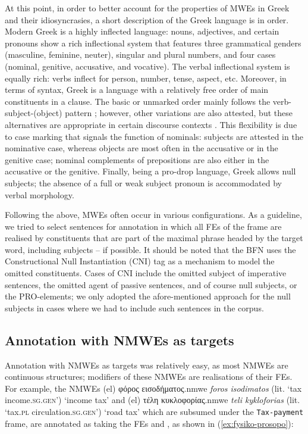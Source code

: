 \documentclass[output=paper,colorlinks,citecolor=brown]{langscibook}
\begin{document}
At this point, in order to better account for the properties of MWEs in Greek and their idiosyncrasies, a short description of the Greek language is in order. Modern Greek is a highly inflected language: nouns, adjectives, and certain pronouns show a rich inflectional system that features three grammatical genders (masculine, feminine, neuter), singular and plural numbers, and four cases (nominal, genitive, accusative, and vocative). The verbal inflectional system is equally rich: verbs inflect for person, number, tense, aspect, etc. Moreover, in terms of syntax, Greek is a language with a relatively free order of main constituents in a clause. The basic or unmarked order mainly follows the verb-subject-(object) pattern \citep[426]{holton_etal_1997}; however, other variations are also attested, but these alternatives are appropriate in certain discourse contexts \citep{holton_etal_1997}. This flexibility is due to case marking that signals the function of nominals: subjects are attested in the nominative case, whereas objects are most often in the accusative or in the genitive case; nominal complements of prepositions are also either in the accusative or the genitive. Finally, being a pro-drop language, Greek allows null subjects; the absence of a full or weak subject pronoun is accommodated by verbal morphology. 

Following the above, MWEs often occur in various configurations. As a guideline, we tried to select sentences for annotation in which all FEs of the frame are realised by constituents that are part of the maximal phrase headed by the target word, including subjects -- if possible. It should be noted that the BFN uses the Constructional Null Instantiation (CNI) tag as a mechanism to model the omitted constituents. Cases of CNI include the omitted subject of imperative sentences, the omitted agent of passive sentences, and of course null subjects, or the PRO-elements; we only adopted the afore-mentioned approach for the null subjects in cases where we had to include such sentences in the corpus.

\subsection{Annotation with NMWEs as targets}\largerpage
Annotation with NMWEs as targets was relatively easy, as most NMWEs are continuous structures; modifiers of these NMWEs are realisations of their FEs.
For example, the NMWEs (el) {{φόρος}} {{εισοδήματος}}.nmwe \textit{foros isodimatos} (lit. `tax income.\textsc{sg.gen}') `income tax' and (el) {{τέλη}} {{κυκλοφορίας}}.nmwe \textit{teli kykloforias} (lit. `tax.\textsc{pl} circulation.\textsc{sg.gen}') `road tax' which are subsumed under the \texttt{Tax-payment} frame, are annotated as taking the FEs  and , as shown in (\ref{ex:fysiko-prosopo}):
\end{document}
